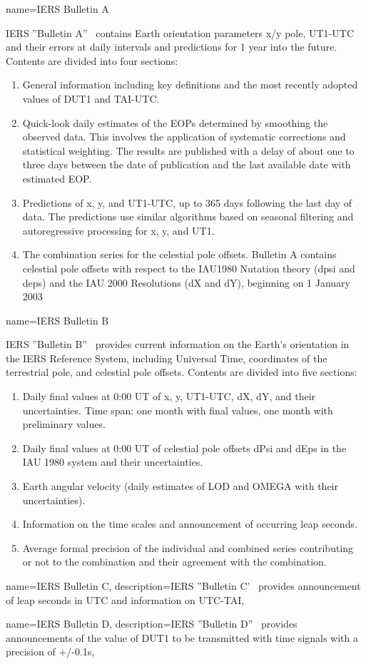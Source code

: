	{name=IERS Bulletin A}
	{\gls{IERS} ''Bulletin A''~\cite{iersBULLETINAProductMetadata} contains Earth orientation parameters x/y pole, UT1-UTC and their errors at daily intervals and predictions for 1 year into the future. Contents are divided into four sections:
	\begin{enumerate}  
		\item General information including key definitions and the most recently adopted values of DUT1 and TAI-UTC.
		\item Quick-look daily estimates of the EOPs determined by smoothing the observed data. This involves the application of systematic corrections and statistical weighting. The results are published with a delay of about one to three days between the date of publication and the last available date with estimated EOP. 
		\item Predictions of x, y, and UT1-UTC, up to 365 days following the last day of data. The predictions use similar algorithms based on seasonal filtering and autoregressive processing for x, y, and UT1.
		\item The combination series for the celestial pole offsets. Bulletin A contains celestial pole offsets with respect to the IAU1980 Nutation theory (dpsi and deps) and the IAU 2000 Resolutions (dX and dY), beginning on 1 January 2003
	\end{enumerate}	}

{name=IERS Bulletin B}
{\gls{IERS} ''Bulletin B''~\cite{iersBULLETINBProductMetadata} provides current information on the Earth's orientation in the IERS Reference System, including Universal Time, coordinates of the terrestrial pole, and celestial pole offsets. Contents are divided into five sections:
	\begin{enumerate}  
		\item Daily final values at 0:00 UT of x, y, UT1-UTC, dX, dY, and their uncertainties. Time span: one month with final values, one month with preliminary values.
		\item Daily final values at 0:00 UT of celestial pole offsets dPsi and dEps in the IAU 1980 system and their uncertainties.
		\item Earth angular velocity (daily estimates of LOD and OMEGA with their uncertainties).
		\item Information on the time scales and announcement of occurring leap seconds.
		\item Average formal precision of the individual and combined series contributing or not to the combination and their agreement with the combination.
	\end{enumerate}	
}

 {
	name={IERS Bulletin C},
	description={\gls{IERS} ''Bulletin C'~\cite{iersBULLETINCProductMetadata} provides announcement of leap seconds in UTC and information on UTC-TAI},
}

 {
	name={IERS Bulletin D},
	description={\gls{IERS} ''Bulletin D''~\cite{iersBULLETINDProductMetadata} provides announcements of the value of DUT1 to be transmitted with time signals with a precision of +/-0.1s},
}
